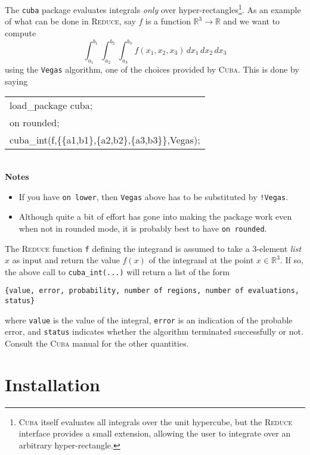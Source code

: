 \documentclass[11pt]{article}
\newcommand{\Reduce}{\textsc{Reduce}}
\newcommand{\Cuba}{\textsc{Cuba}}
\begin{document}
The \texttt{cuba} package evaluates integrals \emph{only} over
hyper-rectangles\footnote{{\Cuba} itself evaluates all integrals over the unit
  hypercube, but the {\Reduce} interface provides a small extension, allowing
  the user to integrate over an arbitrary hyper-rectangle.}.  As an example of
what can be done in {\Reduce}, say $f$ is a function $\mathbb{R}^3\to
\mathbb{R}$ and we want to compute
\begin{equation*}
  \int_{a_1}^{b_1} \int_{a_2}^{b_2} \int_{a_3}^{b_3} f(x_1,x_2,x_3)\, dx_1 \,
  dx_2 \, dx_3
\end{equation*}
using the \texttt{Vegas} algorithm, one of the choices provided by {\Cuba}.
This is done by saying
\begin{table*}[h]
  \centering
  \ttfamily
  \begin{tabular}{l}
    load\_package cuba; \\
    on rounded; \\
    cuba\_int(f,\{\{a1,b1\},\{a2,b2\},\{a3,b3\}\},Vegas);
  \end{tabular}
\end{table*}\\
\noindent\textbf{Notes}
\begin{itemize}
   \item If you have \texttt{on lower}, then \texttt{Vegas} above has to be
     substituted by \texttt{!Vegas}.
   \item Although quite a bit of effort has gone into making the package work
     even when not in rounded mode, it is probably best to have \texttt{on
       rounded}.
\end{itemize}
The {\Reduce} function \texttt{f} defining the integrand is assumed to take a
3-element \emph{list} $x$ as input and return the value $f(x)$ of the integrand
at the point $x\in\mathbb{R}^3$.  If so, the above call to
\texttt{cuba\_int(...)} will return a list of the form
\begin{center}
  \texttt{\{value, error, probability, number of regions,
            number of evaluations, status\}}
\end{center}
where \texttt{value} is the value of the integral, \texttt{error} is an
indication of the probable error, and \texttt{status} indicates whether the
algorithm terminated successfully or not.  Consult the {\Cuba} manual for the
other quantities.


\section{Installation}
\end{document}
